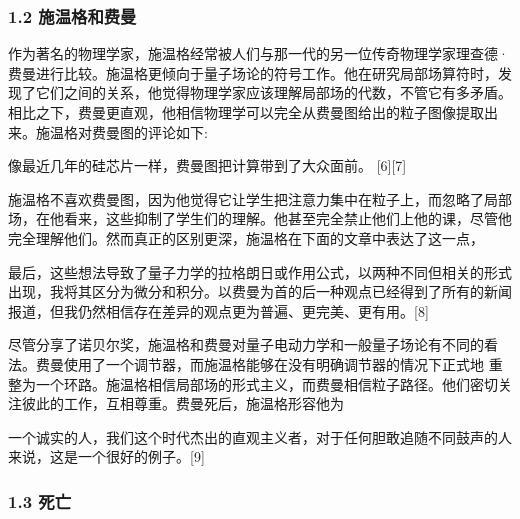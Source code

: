 \subsubsection{1.2 施温格和费曼}
作为著名的物理学家，施温格经常被人们与那一代的另一位传奇物理学家理查德·费曼进行比较。施温格更倾向于量子场论的符号工作。他在研究局部场算符时，发现了它们之间的关系，他觉得物理学家应该理解局部场的代数，不管它有多矛盾。相比之下，费曼更直观，他相信物理学可以完全从费曼图给出的粒子图像提取出来。施温格对费曼图的评论如下:

像最近几年的硅芯片一样，费曼图把计算带到了大众面前。 [6][7]

施温格不喜欢费曼图，因为他觉得它让学生把注意力集中在粒子上，而忽略了局部场，在他看来，这些抑制了学生们的理解。他甚至完全禁止他们上他的课，尽管他完全理解他们。然而真正的区别更深，施温格在下面的文章中表达了这一点，

最后，这些想法导致了量子力学的拉格朗日或作用公式，以两种不同但相关的形式出现，我将其区分为微分和积分。以费曼为首的后一种观点已经得到了所有的新闻报道，但我仍然相信存在差异的观点更为普遍、更完美、更有用。[8]

尽管分享了诺贝尔奖，施温格和费曼对量子电动力学和一般量子场论有不同的看法。费曼使用了一个调节器，而施温格能够在没有明确调节器的情况下正式地 重整为一个环路。施温格相信局部场的形式主义，而费曼相信粒子路径。他们密切关注彼此的工作，互相尊重。费曼死后，施温格形容他为

一个诚实的人，我们这个时代杰出的直观主义者，对于任何胆敢追随不同鼓声的人来说，这是一个很好的例子。[9]

\subsubsection{1.3 死亡}